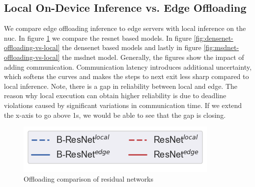 \subsection{Local On-Device Inference vs. Edge Offloading}
We compare edge offloading inference to edge servers with local inference on the \gls{nuc}. In figure \ref{fig:resnet-offloading-vs-local} we compare the \gls{resnet} based models. In figure \ref{fig:densenet-offloading-vs-local} the \gls{densenet} based models and lastly in figure \ref{fig:msdnet-offloading-vs-local} the \gls{msdnet} model.
Generally, the figures show the impact of adding communication. Communication latency introduces additional uncertainty, which softens the curves and makes the steps to next exit less sharp compared to local inference. Note, there is a gap in reliability between local and edge. The reason why local execution can obtain higher reliability is due to deadline violations caused by significant variations in communication time. If we extend the x-axis to go above 1s, we would be able to see that the gap is closing. 
\begin{figure}
	\captionsetup[subfigure]{justification=centering, farskip=0pt,captionskip=0pt}
	\centering
	\includegraphics[width=.3\linewidth]{figures/edge/gpu_b-resnet_offloading_vs_local_legend}
	\hfill
	\hfill
	\caption[Offloading comparison of residual networks]{Offloading comparison of residual networks}
	\label{fig:resnet-offloading-vs-local}
\end{figure}

